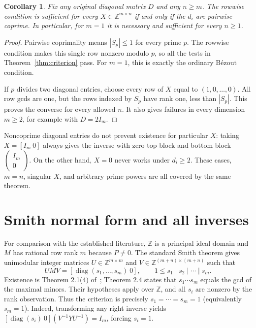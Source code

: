\documentclass[11pt]{article}
\newtheorem{corollary}[theorem]{Corollary}
\DeclareMathOperator{\diag}{diag}
\newcommand{\Z}{\mathbb Z}
\begin{document}
\begin{corollary}\label{cor:rowwise}
Fix any original diagonal matrix $D$ and any $n\ge m$. The rowwise
condition is sufficient for every $X\in\Z^{m\times n}$ if and only
if the $d_i$ are pairwise coprime. In particular, for $m=1$ it is
necessary and sufficient for every $n\ge1$.
\end{corollary}
\begin{proof}
Pairwise coprimality means $|S_p|\le1$ for every prime $p$. The rowwise
condition makes this single row nonzero modulo $p$, so all the tests
in Theorem~\ref{thm:criterion} pass. For $m=1$, this is exactly
the ordinary B\'ezout condition.

If $p$ divides two diagonal entries, choose every row of $X$ equal
to $(1,0,\ldots,0)$. All row gcds are one, but the rows indexed by
$S_p$ have rank one, less than $|S_p|$. This proves the converse
for every allowed $n$. It also gives failures in every dimension
$m\ge2$, for example with $D=2I_m$.
\end{proof}
Noncoprime diagonal entries do not prevent existence for particular
$X$: taking $X=[I_m\ 0]$ always gives the inverse with zero top block
and bottom block $\begin{pmatrix}I_m\\0\end{pmatrix}$. On the other
hand, $X=0$ never works under $d_i\ge2$. These cases, $m=n$, singular
$X$, and arbitrary prime powers are all covered by the same theorem.

\section{Smith normal form and all inverses}
For comparison with the established literature, $\Z$ is a principal
ideal domain and $M$ has rational row rank $m$ because $P\ne0$.
The standard Smith theorem gives unimodular integer matrices
$U\in\Z^{m\times m}$ and $V\in\Z^{(m+n)\times(m+n)}$ such that
\[
 UMV=[\diag(s_1,\ldots,s_m)\ 0],
 \qquad 1\le s_1\mid s_2\mid\cdots\mid s_m.
\]
Existence is Theorem 2.1(4) of~\cite{stanley}; Theorem 2.4 states
that $s_1\cdots s_m$ equals the gcd of the maximal minors.
Their hypotheses apply over $\Z$, and all $s_i$ are nonzero by the
rank observation. Thus the criterion is precisely $s_1=\cdots=s_m=1$
(equivalently $s_m=1$). Indeed, transforming any right inverse yields
$[\diag(s_i)\ 0](V^{-1}YU^{-1})=I_m$, forcing $s_i=1$.
\end{document}
